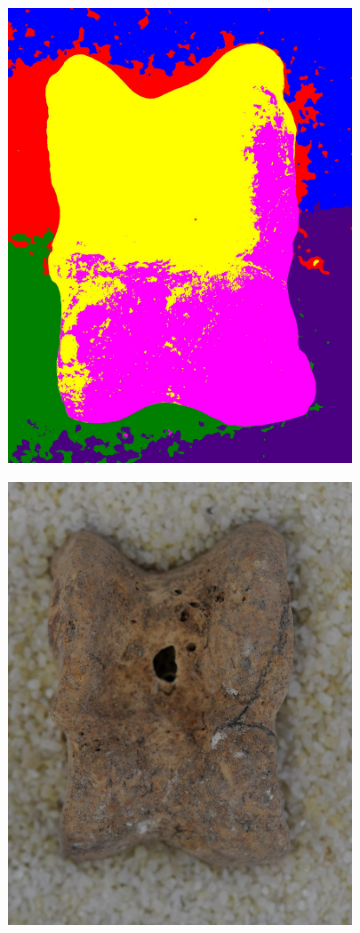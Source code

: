\documentclass[pdftex,12pt,a4paper]{report}
\begin{document}
\begin{figure}[h]
\begin{subfigure}[b]{0.24\textwidth}
		\centering
		\includegraphics[width=.9\linewidth]{img/segmentation/good/slic/segmented.jpg}
		\subcaption*{}
		\label{}
	\end{subfigure}
	\begin{subfigure}[b]{0.24\textwidth}
		\centering
		\includegraphics[width=.9\linewidth]{img/segmentation/bad/slic/cut.jpg}

\end{subfigure}
\end{figure}
\end{document}
